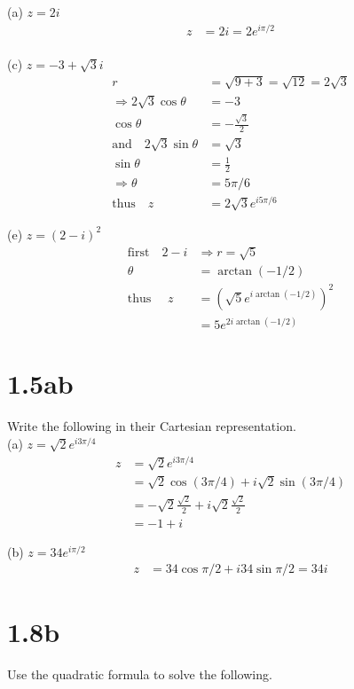 \documentclass[a4paper, 11pt]{article}
\begin{document}
\noindent(a) $z=2i$ 
	\begin{align*}
		z &= 2i = 2e^{i\pi/2} \\ 
	\end{align*}
	
\noindent(c) $z=-3+\sqrt{3}i$ 
	\begin{align*}
		r &= \sqrt{9+3} = \sqrt{12} = 2\sqrt{3} \\ 
		\Rightarrow 2\sqrt{3}\cos\theta &= -3 \\ 
			\cos\theta &= -\frac{\sqrt{3}}{2} \\ 
		\text{and} \quad 2\sqrt{3}\sin\theta &= \sqrt{3} \\ 
			\sin\theta &= \frac{1}{2}\\ 
		\Rightarrow \theta &= 5\pi/6 \\ 
		\text{thus} \quad  z &= 2\sqrt{3}e^{i5\pi/6}
	\end{align*}

\noindent(e) $z = (2-i)^2$ 
	\begin{align*}
		\text{first}\quad 2-i &\Rightarrow r = \sqrt{5} \\ 
			\theta &= \arctan(-1/2) \\ 
		\text{thus }\quad z &= (\sqrt{5}e^{i\arctan(-1/2)})^2 \\ 
			&= 5e^{2i\arctan(-1/2)}
	\end{align*}
	
\section*{1.5ab}
Write the following in their Cartesian representation.\\

\noindent(a) $z=\sqrt{2}e^{i3\pi/4}$
	\begin{align*}
		z &=\sqrt{2}e^{i3\pi/4} \\
			&= \sqrt{2}\cos(3\pi/4)+i\sqrt{2}\sin(3\pi/4) \\ 
			&= -\sqrt{2}\frac{\sqrt{2}}{2}+i\sqrt{2}\frac{\sqrt{2}}{2} \\ 
			&= -1+i
	\end{align*}
	
\noindent(b) $z = 34e^{i\pi/2}$ 
	\begin{align*}
		z &= 34\cos\pi/2 + i34\sin\pi/2 = 34i 
	\end{align*}

\section*{1.8b}
Use the quadratic formula to solve the following. \\
\end{document}
